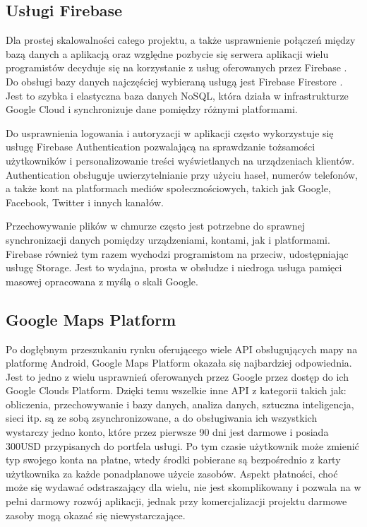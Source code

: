 \subsection*{Usługi Firebase}
Dla prostej skalowalności całego projektu, a także usprawnienie połączeń między bazą danych a aplikacją oraz względne pozbycie się serwera aplikacji wielu programistów decyduje się na korzystanie z usług oferowanych przez Firebase \cite{firebase}. Do obsługi bazy danych najczęściej wybieraną usługą jest Firebase Firestore \cite{firebase-book}. Jest to szybka i elastyczna baza danych NoSQL, która działa w infrastrukturze Google Cloud i synchronizuje dane pomiędzy różnymi platformami.\par
Do usprawnienia logowania i autoryzacji w aplikacji często wykorzystuje się usługę Firebase Authentication \cite{fireauth} pozwalającą na sprawdzanie tożsamości użytkowników i personalizowanie treści wyświetlanych na urządzeniach klientów. Authentication obsługuje uwierzytelnianie przy użyciu haseł, numerów telefonów, a także kont na platformach mediów społecznościowych, takich jak Google, Facebook, Twitter i innych kanałów.\par
Przechowywanie plików w chmurze często jest potrzebne do sprawnej synchronizacji danych pomiędzy urządzeniami, kontami, jak i platformami. Firebase również tym razem wychodzi programistom na przeciw, udostępniając usługę Storage. Jest to wydajna, prosta w obsłudze i niedroga usługa pamięci masowej opracowana z myślą o skali Google.

\subsection*{Google Maps Platform}
Po dogłębnym przeszukaniu rynku oferującego wiele API obsługujących mapy na platformę Android, Google Maps Platform \cite{gmapsand} okazała się najbardziej odpowiednia. Jest to jedno z wielu usprawnień oferowanych przez Google przez dostęp do ich Google Clouds Platform. Dzięki temu wszelkie inne API z kategorii takich jak: obliczenia, przechowywanie i bazy danych, analiza danych, sztuczna inteligencja, sieci itp. są ze sobą zsynchronizowane, a do obsługiwania ich wszystkich wystarczy jedno konto, które przez pierwsze 90 dni jest darmowe i posiada 300USD przypisanych do portfela usługi. Po tym czasie użytkownik może zmienić typ swojego konta na płatne, wtedy środki pobierane są bezpośrednio z karty użytkownika za każde ponadplanowe użycie zasobów.
Aspekt płatności, choć może się wydawać odstraszający dla wielu, nie jest skomplikowany i pozwala na w pełni darmowy rozwój aplikacji, jednak przy komercjalizacji projektu darmowe zasoby mogą okazać się niewystarczające. \cite{gmapsogol}


